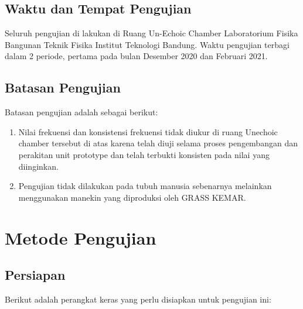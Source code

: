 \documentclass[12pt,]{article}
\begin{document}
	\subsection{Waktu dan Tempat Pengujian}
	
	Seluruh pengujian di lakukan di Ruang Un-Echoic Chamber Laboratorium Fisika Bangunan Teknik Fisika 
	Institut Teknologi Bandung. Waktu pengujian terbagi dalam 2 periode, pertama pada bulan Desember 2020 dan Februari 2021.
	
	\subsection{Batasan Pengujian}
	
	Batasan pengujian adalah sebagai berikut:
	
	\begin{enumerate}
		\item Nilai frekuensi dan konsistensi frekuensi tidak diukur di ruang Unechoic chamber tersebut di atas 
		karena telah diuji selama proses pengembangan dan perakitan unit prototype dan telah terbukti konsisten pada nilai yang diinginkan.
		
		\item Pengujian tidak dilakukan pada tubuh manusia sebenarnya melainkan menggunakan manekin yang diproduksi oleh GRASS KEMAR.
	\end{enumerate}


	\newpage
	\section{Metode Pengujian}
	
	\subsection{Persiapan}
	
	Berikut adalah perangkat keras yang perlu disiapkan untuk pengujian ini:
\end{document}
